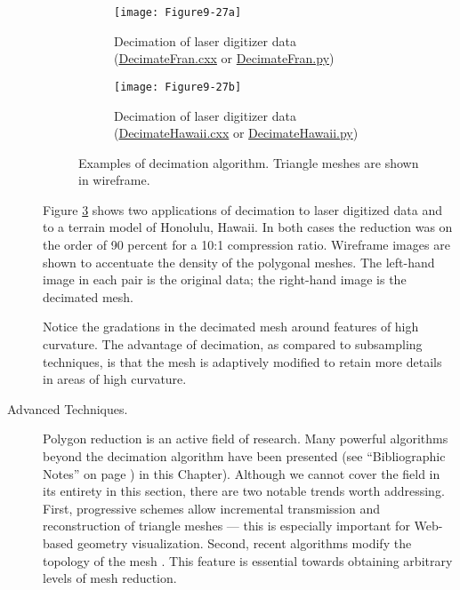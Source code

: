\begin{description}
\begin{figure}[htb]
    \centering
	\begin{subfigure}[h]{0.96\linewidth}
		\texttt{[image: Figure9-27a]}
		\captionsetup{justification=centering}
		\caption{Decimation of laser digitizer data (\href{https://lorensen.github.io/VTKExamples/site/Cxx/VisualizationAlgorithms/DecimateFran/}{DecimateFran.cxx} or \href{https://lorensen.github.io/VTKExamples/site/Python/VisualizationAlgorithms/DecimateFran/}{DecimateFran.py})}
		\label{fig:Figure9-27a}
	\end{subfigure}
	\hfill
	\begin{subfigure}[h]{0.96\linewidth}
		\texttt{[image: Figure9-27b]}
		\captionsetup{justification=centering}
		\caption{Decimation of laser digitizer data (\href{https://lorensen.github.io/VTKExamples/site/Cxx/VisualizationAlgorithms/DecimateHawaii/}{DecimateHawaii.cxx} or \href{https://lorensen.github.io/VTKExamples/site/Python/VisualizationAlgorithms/DecimateHawaii/}{DecimateHawaii.py})}
		\label{fig:Figure9-27b}
	\end{subfigure}
	\caption{Examples of decimation algorithm. Triangle meshes are shown in wireframe.}\label{fig:Figure9-27}
\end{figure}

Figure \ref{fig:Figure9-27} shows two applications of decimation to laser digitized data and to a terrain model of Honolulu, Hawaii. In both cases the reduction was on the order of 90 percent for a 10:1 compression ratio. Wireframe images are shown to accentuate the density of the polygonal meshes. The left-hand image in each pair is the original data; the right-hand image is the decimated mesh.

Notice the gradations in the decimated mesh around features of high curvature. The advantage of decimation, as compared to subsampling techniques, is that the mesh is adaptively modified to retain more details in areas of high curvature.

\item[Advanced Techniques.] Polygon reduction is an active field of research. Many powerful algorithms beyond the decimation algorithm have been presented (see ``Bibliographic Notes'' on page  \pageref{sec:bibliographic_notes.ch09}) in this Chapter). Although we cannot cover the field in its entirety in this section, there are two notable trends worth addressing. First, progressive schemes \cite{Hoppe96} allow incremental transmission and reconstruction of triangle meshes --- this is especially important for Web-based geometry visualization. Second, recent algorithms modify the topology of the mesh \cite{He96} \cite{Popovic97} \cite{Schroeder97}. This feature is essential towards obtaining arbitrary levels of mesh reduction.


\end{description}
